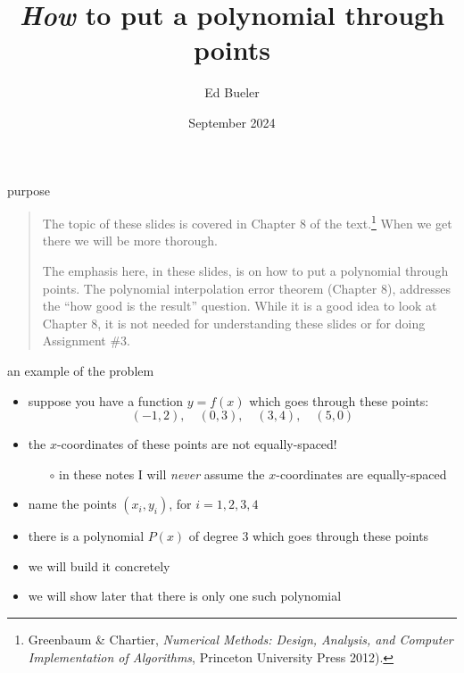 \documentclass[10pt,hyperref]{beamer}
\title{\emph{How} to put a polynomial through points}
\author{Ed Bueler}
\institute{MATH 426 Numerical Analysis}
\date{September 2024}
\date{}
\begin{document}
\begin{frame}
  \maketitle
\end{frame}


\begin{frame}{purpose}
\begin{quote}
The topic of these slides is covered in Chapter 8 of the text.\footnote{Greenbaum \& Chartier, \emph{Numerical Methods: Design, Analysis, and Computer Implementation of Algorithms}, Princeton University Press 2012).}  When we get there we will be more thorough.

\bigskip
The emphasis here, in these slides, is on \alert{how} to put a polynomial through points.  The polynomial interpolation error theorem (Chapter 8), addresses the ``how good is the result'' question.  While it is a good idea to look at Chapter 8, it is not needed for understanding these slides or for doing Assignment \#3.
\end{quote}
\end{frame}

\begin{frame}{an example of the problem}

\begin{itemize}
\item suppose you have a function $y=f(x)$ which goes through these points:
   $$(-1,2), \quad (0,3), \quad (3,4), \quad (5,0)$$
\item the $x$-coordinates of these points are not equally-spaced!
  \begin{itemize}
  \item[$\circ$]  in these notes I will \emph{never} assume the $x$-coordinates are equally-spaced
  \end{itemize}
\item name the points $(x_i,y_i)$, for $i=1,2,3,4$
\item there is a polynomial $P(x)$ of degree 3 which goes through these points
\item we will build it concretely
\item we will show later that there is only one such polynomial
\end{itemize}
\end{frame}
\end{document}
